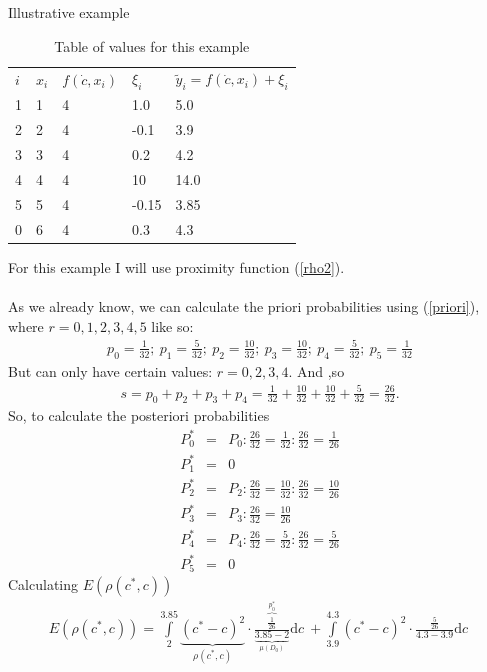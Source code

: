 \begin{subsection}{Illustrative example}
\begin{table}[h!]
\caption {Table of values for this example} \label{tab:title} 
\centering
\begin{tabular}{lllll}
$i$ & $x_{i}$ & $f(\dot{c},x_{i})$ & $\xi_{i}$  & $\tilde{y}_{i}=f(\dot{c},x_{i})+\xi_{i}$  \\
1 & 1 & 4      & 1.0   & 5.0   \\
2 & 2 & 4      & -0.1  & 3.9   \\
3 & 3 & 4      & 0.2   & 4.2   \\
4 & 4 & 4      & 10    & 14.0  \\
5 & 5 & 4      & -0.15 & 3.85  \\
0 & 6 & 4      & 0.3   & 4.3  
\end{tabular}
\end{table}
\noindent
For this example I will use proximity function (\ref{rho2}). \\
\\
As we already know, we can calculate the priori probabilities using (\ref{priori}), where $r=0,1,2,3,4,5$ like so:
\begin{gather*}
p_{0}= \frac{1}{32}; \ p_{1}= \frac{5}{32}; \ p_{2}= \frac{10}{32}; \ p_{3}= \frac{10}{32}; \ p_{4}= \frac{5}{32}; \ p_{5}= \frac{1}{32}
\end{gather*}
But can only have certain values: $r=0,2,3,4$. And ,so 
\begin{gather*}
s=p_{0}+p_{2}+p_{3}+p_{4}= \frac{1}{32} + \frac{10}{32} + \frac{10}{32} + \frac{5}{32} = \frac{26}{32}.
\end{gather*}
So, to calculate the posteriori probabilities
\begin{eqnarray*}
P_{0}^{*} &=& P_{0}: \frac{26}{32} = \frac{1}{32} : \frac{26}{32} = \frac{1}{26} \\
P_{1}^{*} &=& 0 \\
P_{2}^{*} &=& P_{2}: \frac{26}{32} = \frac{10}{32} : \frac{26}{32} = \frac{10}{26} \\
P_{3}^{*} &=& P_{3}: \frac{26}{32} = \frac{10}{26} \\
P_{4}^{*} &=& P_{4}: \frac{26}{32} = \frac{5}{32} : \frac{26}{32} = \frac{5}{26} \\
P_{5}^{*} &=& 0
\end{eqnarray*}
Calculating $E(\rho(c^{*},c))$
\begin{gather*}
E(\rho(c^{*},c)) = \int\limits_{2}^{3.85} \underbrace{(c^{*}-c)^{2}}_{\rho(c^{*},c)} \cdot \frac{\overbrace{\frac{1}{26}}^{p_{0}^{*}}}{\underbrace{3.85-2}_{\mu(D_{0})}} \mathrm{d}c \ + \int\limits_{3.9}^{4.3} (c^{*}-c)^{2} \cdot \frac{\frac{5}{26}}{4.3-3.9} \mathrm{d}c \

\end{gather*}
\end{subsection}
